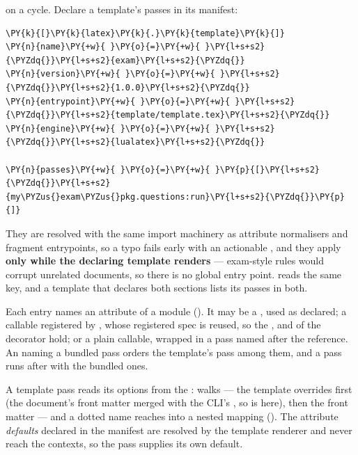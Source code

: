 \documentclass[a4paper,twoside]{article}
\begin{document}
 on a cycle. Declare a template's passes in its manifest:
\begin{tscode}[lang=toml, engine=pygments]
\begin{Verbatim}[commandchars=\\\{\},breaklines, breakanywhere, commandchars=\\\{\}]
\PY{k}{[}\PY{k}{latex}\PY{k}{.}\PY{k}{template}\PY{k}{]}
\PY{n}{name}\PY{+w}{ }\PY{o}{=}\PY{+w}{ }\PY{l+s+s2}{\PYZdq{}}\PY{l+s+s2}{exam}\PY{l+s+s2}{\PYZdq{}}
\PY{n}{version}\PY{+w}{ }\PY{o}{=}\PY{+w}{ }\PY{l+s+s2}{\PYZdq{}}\PY{l+s+s2}{1.0.0}\PY{l+s+s2}{\PYZdq{}}
\PY{n}{entrypoint}\PY{+w}{ }\PY{o}{=}\PY{+w}{ }\PY{l+s+s2}{\PYZdq{}}\PY{l+s+s2}{template/template.tex}\PY{l+s+s2}{\PYZdq{}}
\PY{n}{engine}\PY{+w}{ }\PY{o}{=}\PY{+w}{ }\PY{l+s+s2}{\PYZdq{}}\PY{l+s+s2}{lualatex}\PY{l+s+s2}{\PYZdq{}}

\PY{n}{passes}\PY{+w}{ }\PY{o}{=}\PY{+w}{ }\PY{p}{[}\PY{l+s+s2}{\PYZdq{}}\PY{l+s+s2}{my\PYZus{}exam\PYZus{}pkg.questions:run}\PY{l+s+s2}{\PYZdq{}}\PY{p}{]}
\end{Verbatim}
\end{tscode}
They are resolved with the same import machinery as attribute normalisers and
fragment entrypoints, so a typo fails early with an actionable ,
and they apply \textbf{only while the declaring template renders} --- exam-style rules
would corrupt unrelated documents, so there is no global entry point.
 reads the same key, and a template that declares both
sections lists its passes in both.

Each entry names an attribute of a module (). It
may be a , used as declared; a callable registered by ,
whose registered spec is reused, so the ,  and  of the
decorator hold; or a plain  callable,
wrapped in a  pass named after the reference. An  naming a bundled
pass orders the template's pass among them, and a  pass runs
after  with the bundled  ones.

A template pass reads its options from the :
 walks  --- the template
overrides first (the document's front matter merged with the CLI's
, so  is  here), then the front matter ---
and a dotted name reaches into a nested mapping ().
The attribute \emph{defaults} declared in the manifest are resolved by the template
renderer and never reach the contexts, so the pass supplies its own default.
\end{document}
